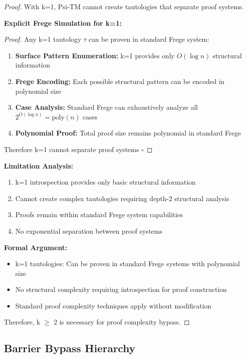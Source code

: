 \documentclass[11pt]{article}
\newcommand{\qed}{\hfill$\square$}
\begin{document}
\begin{proof}
With k=1, Psi-TM cannot create tautologies that separate proof systems.

\textbf{Explicit Frege Simulation for k=1:}
\begin{proof}
Any k=1 tautology $\tau$ can be proven in standard Frege system:
\begin{enumerate}
\item \textbf{Surface Pattern Enumeration:} k=1 provides only $O(\log n)$ structural information
\item \textbf{Frege Encoding:} Each possible structural pattern can be encoded in polynomial size
\item \textbf{Case Analysis:} Standard Frege can exhaustively analyze all $2^{O(\log n)} = \text{poly}(n)$ cases
\item \textbf{Polynomial Proof:} Total proof size remains polynomial in standard Frege
\end{enumerate}
Therefore k=1 cannot separate proof systems \qed
\end{proof}

\textbf{Limitation Analysis:}
\begin{enumerate}
\item k=1 introspection provides only basic structural information
\item Cannot create complex tautologies requiring depth-2 structural analysis
\item Proofs remain within standard Frege system capabilities
\item No exponential separation between proof systems
\end{enumerate}

\textbf{Formal Argument:}
\begin{itemize}
\item k=1 tautologies: Can be proven in standard Frege systems with polynomial size
\item No structural complexity requiring introspection for proof construction
\item Standard proof complexity techniques apply without modification
\end{itemize}

Therefore, k $\geq$ 2 is necessary for proof complexity bypass.
\end{proof}

\subsection{Barrier Bypass Hierarchy}
\end{document}
